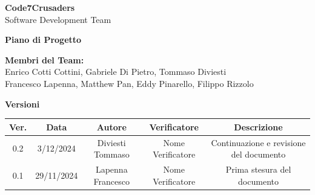\documentclass{article}
\begin{document}
\begin{titlepage}
    {\Huge \textbf{Code7Crusaders}}\\
    \vspace{0.5cm}
    {\Large Software Development Team}\\
    \vspace{2cm}
    
    {\large \textbf{Piano di Progetto}}\\
    \vspace{5cm}
    
    
    \textbf{Membri del Team:}\\
    Enrico Cotti Cottini, Gabriele Di Pietro, Tommaso Diviesti \\
    Francesco Lapenna, Matthew Pan, Eddy Pinarello, Filippo Rizzolo \\
    \vspace{0.5cm}
    
    \vspace{1cm}
\end{titlepage}



\newpage
\begin{table}[h!]
\centering
\textbf{Versioni} \\ %
\vspace{2mm} %
\begin{tabular}{|c|c|c|c|c|}
    \hline
    \textbf{Ver.} & \textbf{Data} & \textbf{Autore} & \textbf{Verificatore} & \textbf{Descrizione} \\
    \hline
    0.2 & 3/12/2024 & Diviesti Tommaso & Nome Verificatore & Continuazione e revisione del documento \\
    0.1 & 29/11/2024 & Lapenna Francesco & Nome Verificatore & Prima stesura del documento \\  
    \hline
\end{tabular}
\end{table}



\newpage
\tableofcontents
\end{document}
